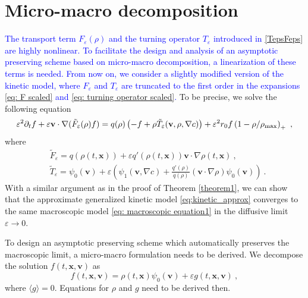 \documentclass{article}
\newcommand {\e}  {\varepsilon}
\newcommand {\bv} { {\mathbf{v}} }
\newcommand {\bx} { {\mathbf{x}} }
\newcommand {\p}   {\partial}
\newcommand{\beq}{\begin{equation}}
\newcommand{\eeq}{\end{equation}}
\begin{document}
\section{Micro-macro decomposition}\label{sec:micro-macro}
\textcolor{blue}{  
The transport term $F_\varepsilon(\rho)$ and the turning operator $T_\varepsilon$ introduced in \eqref{TepsFeps} are highly nonlinear.
To facilitate the design and analysis of an asymptotic preserving scheme based on micro-macro decomposition, a linearization of these terms is needed. 
From now on, we consider a slightly modified version of the kinetic model, where $F_\varepsilon$ and $T_\varepsilon$ are truncated to the first order in the expansions \eqref{eq: F scaled} and \eqref{eq: turning operator scaled}.}
To be precise, we solve the following equation 
\beq
\label{eq:kinetic_approx}
	\e^2 \p_t f + \e \bv \cdot \nabla(\tilde{F}_\varepsilon(\rho)f) = q(\rho) \left(-f + \rho \tilde{T}_\varepsilon(\bv, \rho, \nabla c)\right) + \e^2 r_0f\left(1-\rho/\rho_{\textnormal{max}}\right)_+\ ,
\eeq
where
\begin{align*}
    &\tilde{F}_\varepsilon = q(\rho(t,\bx)) + \varepsilon q'(\rho(t,\bx))\bv\cdot\nabla\rho(t,\bx)\ ,\\
    &\tilde{T}_\varepsilon = \psi_0(\bv) + \varepsilon\left(\psi_1(\bv,\nabla c) + \frac{q'(\rho)}{q(\rho)}(\bv\cdot\nabla\rho)\psi_0(\bv)\right)\ .
\end{align*}
With a similar argument as in the proof of Theorem \ref{theorem1}, we can show that the approximate generalized kinetic model \eqref{eq:kinetic_approx} converges to the same macroscopic model \eqref{eq: macroscopic equation1} in the diffusive limit $\varepsilon\to 0$.

To design an asymptotic preserving scheme which automatically preserves the macroscopic limit, a micro-macro formulation needs to be derived. 
We decompose the solution $f(t,\bx,\bv)$ as 
\begin{equation}\label{def:f_decompose}
    f(t,\bx,\bv) = \rho(t,\bx) \psi_0(\bv) + \varepsilon g(t,\bx,\bv)\ ,
\end{equation}
where $\langle g\rangle = 0$. 
Equations for $\rho$ and $g$ need to be derived then. 
\end{document}
